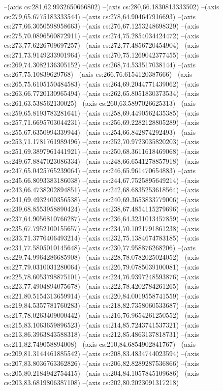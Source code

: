 --(axis cs:281,62.9932650666802)
--(axis cs:280,66.1830813333502)
--(axis cs:279,65.6775183333544)
--(axis cs:278,64.904647916693)
--(axis cs:277,66.3050598958663)
--(axis cs:276,67.1253248698329)
--(axis cs:275,70.0896560872911)
--(axis cs:274,75.2854034424472)
--(axis cs:273,77.6226709697257)
--(axis cs:272,77.4856720454904)
--(axis cs:271,73.9149233901964)
--(axis cs:270,75.1269042377455)
--(axis cs:269,74.3082136305152)
--(axis cs:268,74.533517038144)
--(axis cs:267,75.10839629768)
--(axis cs:266,76.6154120387666)
--(axis cs:265,75.6105150484583)
--(axis cs:264,69.2044771439062)
--(axis cs:263,66.7720130965494)
--(axis cs:262,65.8051830373534)
--(axis cs:261,63.538562130025)
--(axis cs:260,63.5897026625313)
--(axis cs:259,65.8193783281641)
--(axis cs:258,69.4490562435385)
--(axis cs:257,71.6695703044231)
--(axis cs:256,69.2282128805289)
--(axis cs:255,67.6350994339944)
--(axis cs:254,66.842874292493)
--(axis cs:253,71.1781761989496)
--(axis cs:252,70.9723035820203)
--(axis cs:251,69.3897961441921)
--(axis cs:250,68.3611618469068)
--(axis cs:249,67.8847023086334)
--(axis cs:248,66.6541278857918)
--(axis cs:247,65.0425765239064)
--(axis cs:246,65.961470654883)
--(axis cs:245,66.8093383186038)
--(axis cs:244,67.7525895649214)
--(axis cs:243,66.4738202894851)
--(axis cs:242,68.6835253618564)
--(axis cs:241,69.4932400356538)
--(axis cs:240,69.3653833779006)
--(axis cs:239,68.8553958890424)
--(axis cs:238,67.4854115279696)
--(axis cs:237,64.9056810766287)
--(axis cs:236,64.3231013457859)
--(axis cs:235,67.7952100155657)
--(axis cs:234,70.1021791861238)
--(axis cs:233,71.3776406493214)
--(axis cs:232,75.1384674783185)
--(axis cs:231,77.5805010145648)
--(axis cs:230,77.958876268206)
--(axis cs:229,74.9964286685908)
--(axis cs:228,78.0782025024052)
--(axis cs:227,79.0310031280064)
--(axis cs:226,79.0785039100081)
--(axis cs:225,78.6053798875101)
--(axis cs:224,76.9397248593876)
--(axis cs:223,77.4904894075678)
--(axis cs:222,78.4202784261265)
--(axis cs:221,80.5154313659914)
--(axis cs:220,84.0019558741559)
--(axis cs:219,84.5357781760283)
--(axis cs:218,82.7358060533687)
--(axis cs:217,78.0263409000442)
--(axis cs:216,76.9654261250552)
--(axis cs:215,83.1063659896523)
--(axis cs:214,85.7243741537321)
--(axis cs:213,86.3963843588318)
--(axis cs:212,85.4863137818731)
--(axis cs:211,82.749058894008)
--(axis cs:210,84.6854902841767)
--(axis cs:209,81.3144461885542)
--(axis cs:208,83.4834744023594)
--(axis cs:207,83.8036763362826)
--(axis cs:206,82.8289287536866)
--(axis cs:205,80.2184942754415)
--(axis cs:204,84.1057845109686)
--(axis cs:203,83.6819806387108)
--(axis cs:202,80.2023091317218)
